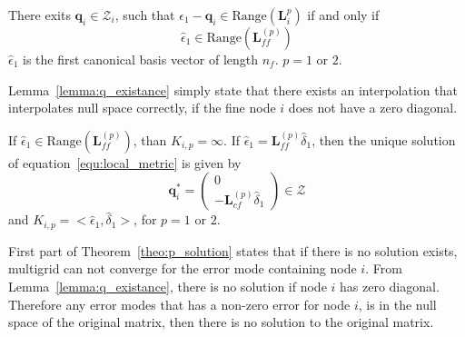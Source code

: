 \begin{lem}\label{lemma:q_existance}There exits $\mathbf{q}_i \in \mathcal{Z}_i$, such that $\epsilon_1 - \mathbf{q}_i \in \text{Range}(\mathbf{L}^p_i)$ if and only if
$$
\hat{\epsilon}_1 \in \text{Range}(\mathbf{L}^{(p)}_{ff})
$$
$\hat{\epsilon}_1$ is the first canonical basis vector of length $n_f$. $p = 1\text{ or }2$.
\end{lem}
Lemma~\ref{lemma:q_existance} simply state that there exists an interpolation that interpolates null space correctly, if the fine node $i$ does not have a zero diagonal.
\begin{theorem}
\label{theo:p_solution}
If $\hat{\epsilon}_1 \in \text{Range}(\mathbf{L}^{(p)}_{ff})$, than $K_{i,p} = \infty$. If $\hat{\epsilon}_1 = \mathbf{L}^{(p)}_{ff} \hat{\delta}_1$, then the unique solution of equation~\ref{equ:local_metric} is given by
\begin{equation}
\mathbf{q}_i^* = \left(\begin{array}{c}0 \\ -\mathbf{L}^{(p)}_{cf}\hat{\delta}_1\end{array}\right)  \in \mathcal{Z}
\end{equation}
and $K_{i,p} = <\hat{\epsilon}_1,\hat{\delta}_1>$, for $p = 1\text{ or }2$.
\end{theorem} 
First part of Theorem~\ref{theo:p_solution} states that if there is no solution exists, multigrid can not converge for the error mode containing node $i$. From Lemma~\ref{lemma:q_existance}, there is no solution if node $i$ has zero diagonal. Therefore any error modes that has a non-zero error for node $i$, is in the null space of the original matrix, then there is no solution to the original matrix.

